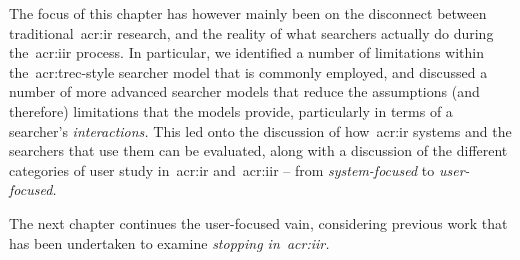 The focus of this chapter has however mainly been on the disconnect between traditional~\gls{acr:ir} research, and the reality of what searchers actually do during the~\gls{acr:iir} process. In particular, we identified a number of limitations within the~\gls{acr:trec}-style searcher model that is commonly employed, and discussed a number of more advanced searcher models that reduce the assumptions (and therefore) limitations that the models provide, particularly in terms of a searcher's \emph{interactions.} This led onto the discussion of how~\gls{acr:ir} systems and the searchers that use them can be evaluated, along with a discussion of the different categories of user study in~\gls{acr:ir} and~\gls{acr:iir} -- from \emph{system-focused} to \emph{user-focused.}

The next chapter continues the user-focused vain, considering previous work that has been undertaken to examine \emph{stopping in~\gls{acr:iir}.}